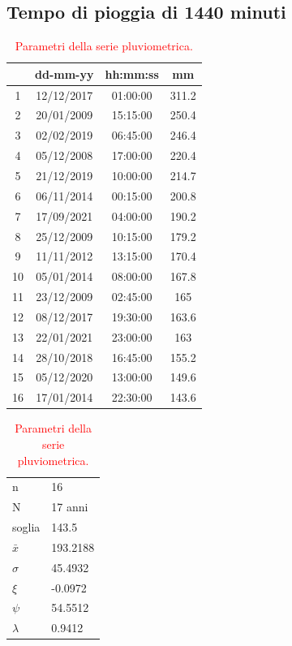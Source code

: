 \subsection{Tempo di pioggia di 1440 minuti}

\begin{table}[H]
    \begin{minipage}{.5\linewidth}
      \caption{\textcolor{red}{Campione della serie pluviometrica.}}
      \centering
        \begin{tabular}{cccc}
            \toprule
            & dd-mm-yy   & hh:mm:ss & mm  \\
         \midrule
         1  & 12/12/2017 & 01:00:00 & 311.2 \\
         2  & 20/01/2009 & 15:15:00 & 250.4 \\
         3  & 02/02/2019 & 06:45:00 & 246.4 \\
         4  & 05/12/2008 & 17:00:00 & 220.4 \\
         5  & 21/12/2019 & 10:00:00 & 214.7 \\
         6  & 06/11/2014 & 00:15:00 & 200.8 \\
         7  & 17/09/2021 & 04:00:00 & 190.2 \\
         8  & 25/12/2009 & 10:15:00 & 179.2 \\
         9  & 11/11/2012 & 13:15:00 & 170.4 \\
         10 & 05/01/2014 & 08:00:00 & 167.8 \\
         11 & 23/12/2009 & 02:45:00 & 165   \\
         12 & 08/12/2017 & 19:30:00 & 163.6 \\
         13 & 22/01/2021 & 23:00:00 & 163   \\
         14 & 28/10/2018 & 16:45:00 & 155.2 \\
         15 & 05/12/2020 & 13:00:00 & 149.6 \\
         16 & 17/01/2014 & 22:30:00 & 143.6 \\
         \bottomrule
        \end{tabular}
    \end{minipage}%
    \begin{minipage}{.5\linewidth}
      \centering
        \caption{\textcolor{red}{Parametri della serie pluviometrica.}}
        \begin{tabular}{ll}
            \toprule
            n        &   16      \\
            N        & 17 anni \\
            soglia   &     143.5    \\
            $\bar{x}$ &    193.2188\\
            $\sigma$ &     45.4932    \\
            $\xi$      &     -0.0972  \\
            $\psi$      &   54.5512  \\
            $\lambda$   &   0.9412 \\
        \bottomrule        
        \end{tabular}
    \end{minipage} 
\end{table}

